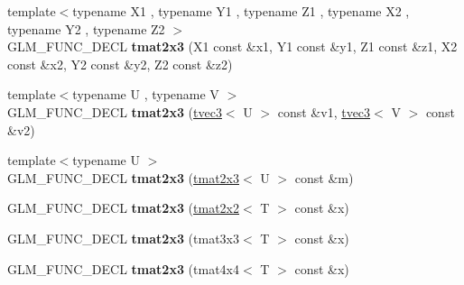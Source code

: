\begin{DoxyCompactItemize}
\item 
\hypertarget{structglm_1_1detail_1_1tmat2x3_a474ba9a15b1b4b89caacf6171cecb7d6}{{\footnotesize template$<$typename X1 , typename Y1 , typename Z1 , typename X2 , typename Y2 , typename Z2 $>$ }\\\-G\-L\-M\-\_\-\-F\-U\-N\-C\-\_\-\-D\-E\-C\-L {\bfseries tmat2x3} (\-X1 const \&x1, \-Y1 const \&y1, \-Z1 const \&z1, \-X2 const \&x2, \-Y2 const \&y2, \-Z2 const \&z2)}\label{structglm_1_1detail_1_1tmat2x3_a474ba9a15b1b4b89caacf6171cecb7d6}

\item 
\hypertarget{structglm_1_1detail_1_1tmat2x3_adf8f24014d50e180f069b45470fd3efd}{{\footnotesize template$<$typename U , typename V $>$ }\\\-G\-L\-M\-\_\-\-F\-U\-N\-C\-\_\-\-D\-E\-C\-L {\bfseries tmat2x3} (\hyperlink{structglm_1_1detail_1_1tvec3}{tvec3}$<$ \-U $>$ const \&v1, \hyperlink{structglm_1_1detail_1_1tvec3}{tvec3}$<$ \-V $>$ const \&v2)}\label{structglm_1_1detail_1_1tmat2x3_adf8f24014d50e180f069b45470fd3efd}

\item 
\hypertarget{structglm_1_1detail_1_1tmat2x3_a06321f59c5841374f5e068e295a3c29f}{{\footnotesize template$<$typename U $>$ }\\\-G\-L\-M\-\_\-\-F\-U\-N\-C\-\_\-\-D\-E\-C\-L {\bfseries tmat2x3} (\hyperlink{structglm_1_1detail_1_1tmat2x3}{tmat2x3}$<$ \-U $>$ const \&m)}\label{structglm_1_1detail_1_1tmat2x3_a06321f59c5841374f5e068e295a3c29f}

\item 
\hypertarget{structglm_1_1detail_1_1tmat2x3_a4c1b720d52e5b9a9355c20d68cc9d931}{\-G\-L\-M\-\_\-\-F\-U\-N\-C\-\_\-\-D\-E\-C\-L {\bfseries tmat2x3} (\hyperlink{structglm_1_1detail_1_1tmat2x2}{tmat2x2}$<$ \-T $>$ const \&x)}\label{structglm_1_1detail_1_1tmat2x3_a4c1b720d52e5b9a9355c20d68cc9d931}

\item 
\hypertarget{structglm_1_1detail_1_1tmat2x3_ad522db54d8643b0b16ba78b0ccf487eb}{\-G\-L\-M\-\_\-\-F\-U\-N\-C\-\_\-\-D\-E\-C\-L {\bfseries tmat2x3} (tmat3x3$<$ \-T $>$ const \&x)}\label{structglm_1_1detail_1_1tmat2x3_ad522db54d8643b0b16ba78b0ccf487eb}

\item 
\hypertarget{structglm_1_1detail_1_1tmat2x3_a5942442eefd2c06e0dddfa1304680474}{\-G\-L\-M\-\_\-\-F\-U\-N\-C\-\_\-\-D\-E\-C\-L {\bfseries tmat2x3} (tmat4x4$<$ \-T $>$ const \&x)}\label{structglm_1_1detail_1_1tmat2x3_a5942442eefd2c06e0dddfa1304680474}


\end{DoxyCompactItemize}
